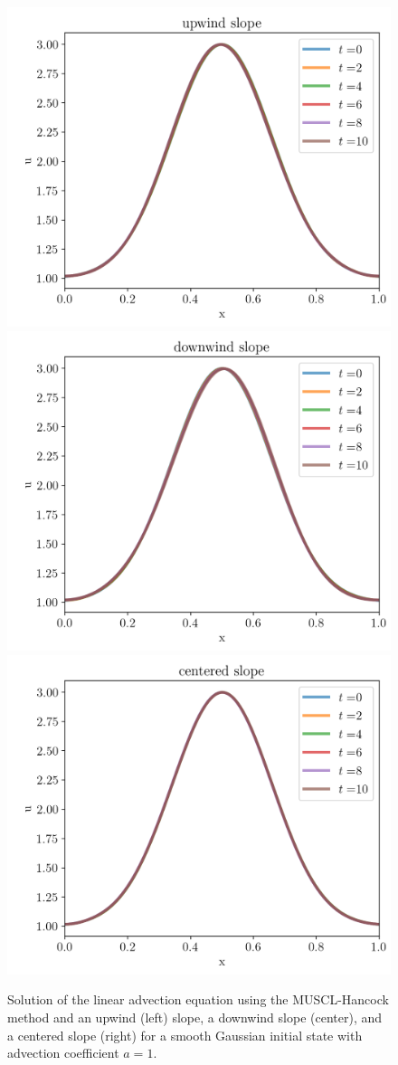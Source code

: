 \begin{figure}
    \centering
    \includegraphics[width=.33\textwidth]{./figures/FV/advection_pwlin/gaussian-upwind.png}%
    \includegraphics[width=.33\textwidth]{./figures/FV/advection_pwlin/gaussian-downwind.png}%
    \includegraphics[width=.33\textwidth]{./figures/FV/advection_pwlin/gaussian-centered.png}%
    \caption{
Solution of the linear advection equation using the MUSCL-Hancock method and an upwind (left)
slope, a downwind slope (center), and a centered slope (right) for a smooth Gaussian initial
state with advection coefficient $a = 1$.
    }
    \label{fig:pwlin-gaussian-no-limiter}
\end{figure}

